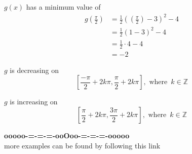 \documentclass{ximera}
\begin{document}
$g(x)$ has a minimum value of
\begin{align*}
g\left( \frac{\pi}{2} \right) &= \frac{1}{2} \left(\left( \frac{\pi}{2} \right) - 3 \right)^2 - 4 \\
                               &= \frac{1}{2} (1 - 3)^2 - 4 \\
                               &= \frac{1}{2} \cdot 4 - 4 \\
                               &=  -2
\end{align*}



$g$ is decreasing on 
\[
\left[ \frac{-\pi}{2} + 2k\pi, \frac{\pi}{2} + 2k\pi \right], \text{ where } \,  k \in \mathbb{Z}
\]




$g$ is increasing on 
\[
\left[ \frac{\pi}{2} + 2k\pi, \frac{3\pi}{2} + 2k\pi \right], \text{ where } \,  k \in \mathbb{Z}
\]






\begin{center}
\textbf{\textcolor{green!50!black}{ooooo-=-=-=-ooOoo-=-=-=-ooooo}} \\

more examples can be found by following this link\\ 

\end{center}
\end{document}
